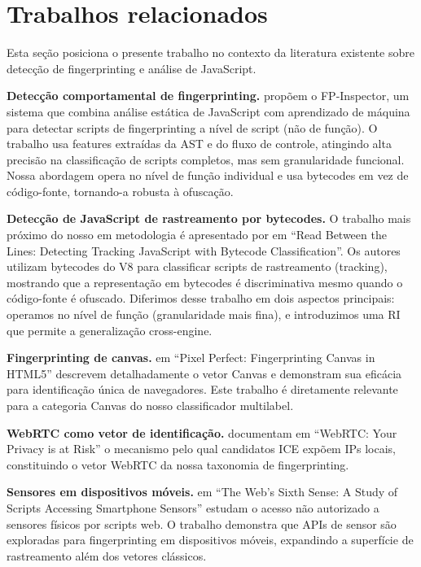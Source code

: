 \section{Trabalhos relacionados}
\label{sec:relacionados}

Esta seção posiciona o presente trabalho no contexto da literatura existente sobre
detecção de fingerprinting e análise de JavaScript.

\textbf{Detecção comportamental de fingerprinting.} 
propõem o FP-Inspector, um sistema que combina análise estática de JavaScript com
aprendizado de máquina para detectar scripts de fingerprinting a nível de
script (não de função). O trabalho usa features extraídas da AST e do fluxo de
controle, atingindo alta precisão na classificação de scripts completos, mas sem
granularidade funcional. Nossa abordagem opera no nível de função individual e usa
bytecodes em vez de código-fonte, tornando-a robusta à ofuscação.

\textbf{Detecção de JavaScript de rastreamento por bytecodes.} O trabalho mais
próximo do nosso em metodologia é apresentado por  em
``Read Between the Lines: Detecting Tracking JavaScript with Bytecode
Classification''. Os autores utilizam bytecodes do V8 para classificar scripts de
rastreamento (tracking), mostrando que a representação em bytecodes é
discriminativa mesmo quando o código-fonte é ofuscado. Diferimos desse trabalho em
dois aspectos principais: operamos no nível de função (granularidade mais fina), e
introduzimos uma RI que permite a generalização cross-engine.

\textbf{Fingerprinting de canvas.}  em
``Pixel Perfect: Fingerprinting Canvas in HTML5'' descrevem detalhadamente
o vetor Canvas e demonstram sua eficácia para identificação única de navegadores.
Este trabalho é diretamente relevante para a categoria Canvas do nosso classificador
multilabel.

\textbf{WebRTC como vetor de identificação.}  documentam em
``WebRTC: Your Privacy is at Risk'' o mecanismo pelo qual candidatos ICE
expõem IPs locais, constituindo o vetor WebRTC da nossa taxonomia de
fingerprinting.

\textbf{Sensores em dispositivos móveis.}  em ``The
Web's Sixth Sense: A Study of Scripts Accessing Smartphone Sensors'' estudam o
acesso não autorizado a sensores físicos por scripts web. O trabalho demonstra que
APIs de sensor são exploradas para fingerprinting em dispositivos móveis,
expandindo a superfície de rastreamento além dos vetores clássicos.

